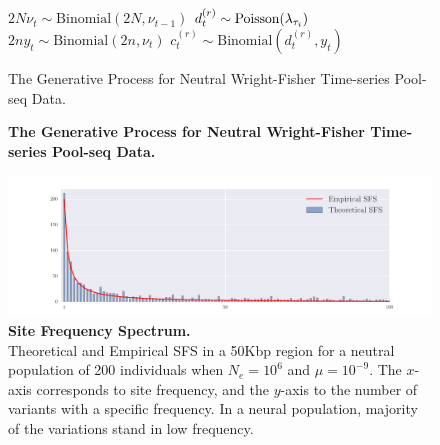 \clearpage
\newpage
\begin{figure}[H]
 \begin{algorithm}[H]
 	\DontPrintSemicolon
 	\SetAlgoNoLine
 	{
 		{
 			$2N\nu_t \sim \text{Binomial}({2N},{\nu_{t-1}})$\;
 			{
 				$d^{(r)}_{t} \sim \operatorname{Poisson}(\lambda_{\tau_i})$ \;
 				$2ny_t \sim \text{Binomial}({2n},{\nu_{t}})$\;  
 				$c^{(r)}_{t} \sim \text{Binomial}(d^{(r)}_{t},{y_{t}})$\; 
 			}
 		}
 	}
 	\caption{The Generative Process for Neutral Wright-Fisher 
 	Time-series Pool-seq Data.} 
 \end{algorithm}
 \caption{{\bf The Generative Process for Neutral Wright-Fisher 
 		Time-series Pool-seq Data.}}
  	\label{proc:arya}
\end{figure}	
\begin{figure}[H]
	\centering
	\includegraphics[trim=.01in 0.1in .01in 
	0.1in,clip,width=\textwidth]{sfs.pdf}
	\caption{{\bf Site Frequency Spectrum.}\\ Theoretical and
          Empirical SFS in a 50Kbp region for a neutral population of 200
          individuals when $N_e=10^6$ and $\mu=10^{-9}$. The $x$-axis 
          corresponds to site frequency, and
          the $y$-axis to the number of variants with a specific
          frequency. 
          In a neural population, majority of the variations stand in low 
          frequency.} \label{fig:sfs}
\end{figure}

